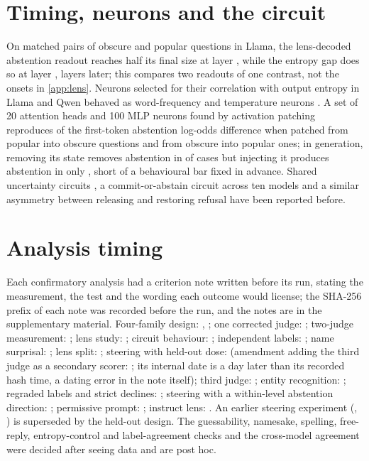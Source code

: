 \documentclass{article}
\begin{document}
\section{Timing, neurons and the circuit}
\label{app:circuit}

On matched pairs of obscure and popular questions in Llama, the lens-decoded abstention readout reaches half its final size at layer \ltHedgeHalf, while the entropy gap does so at layer \ltEntHalf, \ltLead{} layers later; this compares two readouts of one contrast, not the onsets in \cref{app:lens}. Neurons selected for their correlation with output entropy in Llama and Qwen behaved as word-frequency and temperature neurons \citep{stolfo2024confidence,gurnee2024universal}. A set of 20 attention heads and 100 MLP neurons found by activation patching \citep{wang2023ioi,syed2023attribution} reproduces \ciRecovery{} \ciRecoveryCI{} of the first-token abstention log-odds difference when patched from popular into obscure questions and \ciRecoveryUC{} \ciRecoveryUCCI{} from obscure into popular ones; in generation, removing its state removes abstention in \ciRemoveFlip{} of cases but injecting it produces abstention in only \ciInjectFlip, short of a behavioural bar fixed in advance. Shared uncertainty circuits \citep{teplica2025sciurus}, a commit-or-abstain circuit across ten models \citep{nguyen2026commit} and a similar asymmetry between releasing and restoring refusal \citep{liu2026broken} have been reported before.

\section{Analysis timing}
\label{app:timing}

Each confirmatory analysis had a criterion note written before its run, stating the measurement, the test and the wording each outcome would license; the SHA-256 prefix of each note was recorded before the run, and the notes are in the supplementary material. Four-family design: \hashQwenFactorial, \hashGemmaMistralFactorial; one corrected judge: \hashHedgeJudge; two-judge measurement: \hashHedgeMeasure; lens study: \hashLens; circuit behaviour: \hashCircuit; independent labels: \hashEOne; name surprisal: \hashETwo; lens split: \hashEThree; steering with held-out dose: \hashEFour{} (amendment adding the third judge as a secondary scorer: \hashEFourA; its internal date is a day later than its recorded hash time, a dating error in the note itself); third judge: \hashEFive; entity recognition: \hashESix; regraded labels and strict declines: \hashESeven; steering with a within-level abstention direction: \hashEEight; permissive prompt: \hashENine; instruct lens: \hashETen. An earlier steering experiment (\hashSteering, \hashNoHedge) is superseded by the held-out design. The guessability, namesake, spelling, free-reply, entropy-control and label-agreement checks and the cross-model agreement were decided after seeing data and are post hoc.
\end{document}

